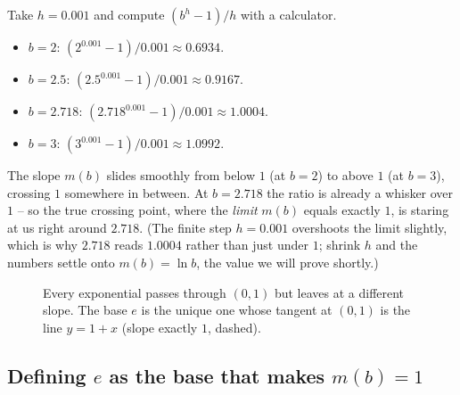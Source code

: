 \begin{labbox}
Take $h = 0.001$ and compute $(b^h - 1)/h$ with a calculator.
\begin{itemize}
\item $b = 2$: \; $(2^{0.001}-1)/0.001 \approx 0.6934$.
\item $b = 2.5$: \; $(2.5^{0.001}-1)/0.001 \approx 0.9167$.
\item $b = 2.718$:\; $(2.718^{0.001}-1)/0.001 \approx 1.0004$.
\item $b = 3$: \; $(3^{0.001}-1)/0.001 \approx 1.0992$.
\end{itemize}
The slope $m(b)$ slides smoothly from below $1$ (at $b=2$) to above $1$
(at $b=3$), crossing $1$ somewhere in between. At $b=2.718$ the ratio is
already a whisker over $1$ -- so the true crossing point, where the
\emph{limit} $m(b)$ equals exactly $1$, is staring at us right around
$2.718$. (The finite step $h=0.001$ overshoots the limit slightly, which is
why $2.718$ reads $1.0004$ rather than just under $1$; shrink $h$ and the
numbers settle onto $m(b)=\ln b$, the value we will prove shortly.)
\end{labbox}

\begin{figure}[H]
\centering
{}
\caption{Every exponential passes through $(0,1)$ but leaves at a different
slope. The base $e$ is the unique one whose tangent at $(0,1)$ is the line
$y = 1 + x$ (slope exactly $1$, dashed).}
\label{ch12:fig-exp-family}
\end{figure}

\subsection{Defining $e$ as the base that makes $m(b)=1$}

